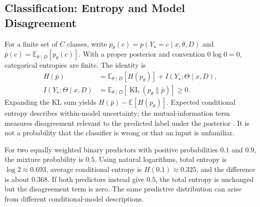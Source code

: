 \subsection{Classification: Entropy and Model Disagreement}

For a finite set of $C$ classes, write $p_\theta(c)=p(Y_\star=c\mid x,\theta,D)$ and $\bar p(c)=\mathbb E_{\theta\mid D}[p_\theta(c)]$. With a proper posterior and convention $0\log0=0$, categorical entropies are finite. The identity is
\begin{align*}
H(\bar p)&=\mathbb E_{\theta\mid D}[H(p_\theta)]
+I(Y_\star;\Theta\mid x,D),\\
I(Y_\star;\Theta\mid x,D)
&=\mathbb E_{\theta\mid D}
\left[\operatorname{KL}(p_\theta\|\bar p)\right]\ge0.
\end{align*}
Expanding the KL sum yields $H(\bar p)-\mathbb E[H(p_\theta)]$. Expected conditional entropy describes within-model uncertainty; the mutual-information term measures disagreement relevant to the predicted label under the posterior \citep{houlsby2011bald}. It is not a probability that the classifier is wrong or that an input is unfamiliar.

For two equally weighted binary predictors with positive probabilities $0.1$ and $0.9$, the mixture probability is $0.5$. Using natural logarithms, total entropy is $\log2\approx0.693$, average conditional entropy is $H(0.1)\approx0.325$, and the difference is about $0.368$. If both predictors instead give $0.5$, the total entropy is unchanged but the disagreement term is zero. The same predictive distribution can arise from different conditional-model descriptions.

\par\addvspace{\intextsep}\noindent\begin{minipage}{\linewidth}
\centering
{}
\label{fig:uncertainty-entropy-decomposition}
\end{minipage}\par\addvspace{\intextsep}

